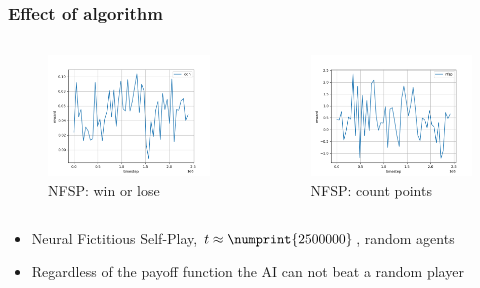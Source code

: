 \begin{frame}
\frametitle{Effect of algorithm}

\begin{columns}[t]

\begin{column}{.5\textwidth}
\begin{figure}
\includegraphics[height=.5\textheight]{nfsp.png}
\caption{NFSP: win or lose}
\end{figure}
\end{column}

\begin{column}{.5\textwidth}
\begin{figure}
\includegraphics[height=.5\textheight]{nfsp-custom-payoff.png}
\caption{NFSP: count points}
\end{figure}
\end{column}

\end{columns}

\begin{itemize}
\item Neural Fictitious Self-Play, $t \approx \numprint{2500000}$, random agents
\item Regardless of the payoff function the AI can not beat a random player
\end{itemize}
\end{frame}

